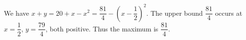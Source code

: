 We have $x+y=20+x-x^2=\dfrac{81}{4}-(x-\dfrac{1}{2})^2$. The upper bound $\dfrac{81}{4}$ occurs at $x=\dfrac{1}{2}$, $y=\dfrac{79}{4}$, both positive. Thus the maximum is $\boxed{\dfrac{81}{4}}$.

